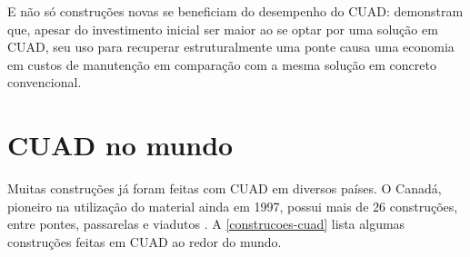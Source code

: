E não só construções novas se beneficiam do desempenho do CUAD:  demonstram que, apesar do investimento inicial ser maior ao se optar por uma solução em CUAD, seu uso para recuperar estruturalmente uma ponte causa uma economia em custos de manutenção em comparação com a mesma solução em concreto convencional.

\section{CUAD no mundo}

Muitas construções já foram feitas com CUAD em diversos países. O Canadá, pioneiro na utilização do material ainda em 1997, possui mais de 26 construções, entre pontes, passarelas e viadutos \cite{Russel_e_Graybeal}. A \autoref{construcoes-cuad} lista algumas construções feitas em CUAD ao redor do mundo.

